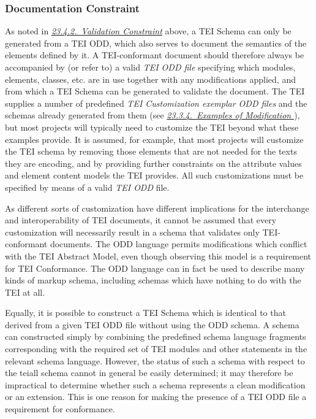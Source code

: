\subsubsection[{Documentation Constraint}]{Documentation Constraint}\label{CFOD}\par
As noted in \textit{\hyperref[CFVL]{23.4.2.\ Validation Constraint}} above, a TEI Schema can only be generated from a TEI ODD, which also serves to document the semantics of the elements defined by it. A TEI-conformant document should therefore always be accompanied by (or refer to) a valid \textit{TEI ODD file} specifying which modules, elements, classes, etc. are in use together with any modifications applied, and from which a TEI Schema can be generated to validate the document. The TEI supplies a number of predefined \textit{TEI Customization exemplar ODD files} and the schemas already generated from them (see \textit{\hyperref[MDlite]{23.3.4.\ Examples of Modification }}), but most projects will typically need to customize the TEI beyond what these examples provide. It is assumed, for example, that most projects will customize the TEI schema by removing those elements that are not needed for the texts they are encoding, and by providing further constraints on the attribute values and element content models the TEI provides. All such customizations must be specified by means of a valid \textit{TEI ODD} file.\par
As different sorts of customization have different implications for the interchange and interoperability of TEI documents, it cannot be assumed that every customization will necessarily result in a schema that validates only TEI-conformant documents. The ODD language permits modifications which conflict with the TEI Abstract Model, even though observing this model is a requirement for TEI Conformance. The ODD language can in fact be used to describe many kinds of markup schema, including schemas which have nothing to do with the TEI at all. \par
Equally, it is possible to construct a TEI Schema which is identical to that derived from a given TEI ODD file without using the ODD schema. A schema can constructed simply by combining the predefined schema language fragments corresponding with the required set of TEI modules and other statements in the relevant schema language. However, the status of such a schema with respect to the \textsf{tei\textunderscore all} schema cannot in general be easily determined; it may therefore be impractical to determine whether such a schema represents a clean modification or an extension. This is one reason for making the presence of a TEI ODD file a requirement for conformance.
